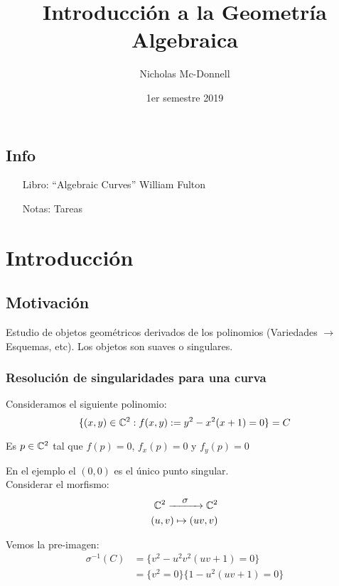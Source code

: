 

\title{Introducción a la Geometría Algebraica}
\author{Nicholas Mc-Donnell}
\date{1er semestre 2019}


\maketitle
\newpage
\tableofcontents
{}
\newpage
\section*{Info}
\begin{itemize}
    \item[Libro:] ``Algebraic Curves'' William Fulton
    \item[Notas:] Tareas
\end{itemize}
\chapter{Introducción}
\section{Motivación}
Estudio de objetos geométricos derivados de los polinomios (Variedades $\rightarrow$ Esquemas, etc). Los objetos son suaves o singulares.

\subsection{Resolución de singularidades para una curva}
Consideramos el siguiente polinomio:
\[
    \{(x,y)\in\mathbb{C}^2: f(x,y):= y^2-x^2(x+1)=0\}=C
\]
\begin{defn}[Singularidad]
    Es $p\in\mathbb{C}^2$ tal que $f(p)=0$, $f_x(p)=0$ y $f_y(p)=0$
\end{defn}
En el ejemplo el $(0,0)$ es el único punto singular.\\
Considerar el morfismo:
\begin{align*}
    \set{C}^2\xrightarrow{\makebox[1cm]{$\sigma$}}\set{C}^2 \\
    (u,v)\mapsto(uv,v)
\end{align*}

Vemos la pre-imagen:
\begin{align*}
    \sigma^{-1}(C) & =\{v^2-u^2v^2(uv+1)=0\}     \\
                   & =\{v^2=0\}\{1-u^2(uv+1)=0\}
\end{align*}

